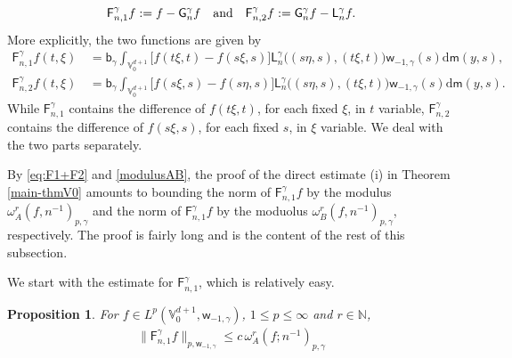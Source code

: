 \documentclass{amsart}
\newtheorem{prop}[thm]{Proposition}
\theoremstyle{remark}
\def\d{\mathrm{d}}
\def\sph{{\mathbb{S}^{d-1}}}
\def\g{{\gamma}}
\def\o{{\omega}}
\def\s{\sigma}
\def\bb{{\mathbf b}}
\def\NN{{\mathbb N}}
\def\VV{{\mathbb V}}
\def\d{\mathrm{d}}
\def\sph{{\mathbb{S}^{d-1}}}
\def\sF{{\mathsf F}}
\def\sG{{\mathsf G}}
\def\sL{{\mathsf L}}
\def\sb{{\mathsf b}}
\def\sm{{\mathsf m}}
\def\sw{{\mathsf w}}
\def\g{{\gamma}}
\def\o{{\omega}}
\def\s{\sigma}
\def\bb{{\mathbf b}}
\def\NN{{\mathbb N}}
\def\VV{{\mathbb V}}
\begin{document}
\begin{equation} \label{eq:Fni}
 \sF_{n,1}^\g f := f - \sG_n^\g f \quad \hbox{and}\quad \sF_{n,2}^\g f := \sG_n^\g f - \sL_n^\g f. 
\end{equation}
More explicitly, the two functions are given by 
\begin{align*}
 \sF_{n,1}^\g f (t,\xi) \,&= \sb_\g \int_{\VV_0^{d+1}} \big[ f(t\xi,t) -f(s\xi, s)\big] \sL_n^\g \big((s\eta,s),(t\xi ,t)\big) \sw_{-1,\g}(s) 
  \d \sm(y,s), \\
 \sF_{n,2}^\g f (t,\xi) \,& = \sb_\g \int_{\VV_0^{d+1}} \big[ f(s \xi,s) -f(s \eta, s)\big] \sL_n^\g \big((s\eta ,s),(t\xi,t)\big) \sw_{-1,\g}(s)  \d \sm(y,s).
\end{align*} 
While $\sF_{n,1}^\g$ contains the difference of $f(t\xi, t)$, for each fixed $\xi$, in $t$ variable, $\sF_{n,2}^\g$ contains the 
difference of $f(s\xi, s)$, for each fixed $s$, in $\xi$ variable. We deal with the two parts separately. 

By \eqref{eq:F1+F2} and \eqref{modulusAB}, the proof of the direct estimate (i) in Theorem \ref{main-thmV0} 
amounts to bounding the norm of $\sF_{n,1}^\gamma f$ by the modulus $\o_A^r(f, n^{-1})_{p,\g}$ and
the norm of $\sF_{n,1}^\gamma f$ by the moduolus $\o_B^r(f, n^{-1})_{p,\g}$, respectively. The proof is 
fairly long and is the content of the rest of this subsection. 

We start with the estimate for $\sF_{n,1}^\g$, which is relatively easy. 
 
\begin{prop}\label{prop:Fn1}
For $f \in L^p(\VV_0^{d+1}, \sw_{-1,\g})$, $1\le p \le \infty$ and $r \in \NN$, 
\begin{align*}
 \| \sF_{n,1}^\g f\|_{p,\sw_{-1,\g}}  \le c \, \omega^r_A (f;  n^{-1})_{p,\g}
\end{align*}
\end{prop}
\end{document}
